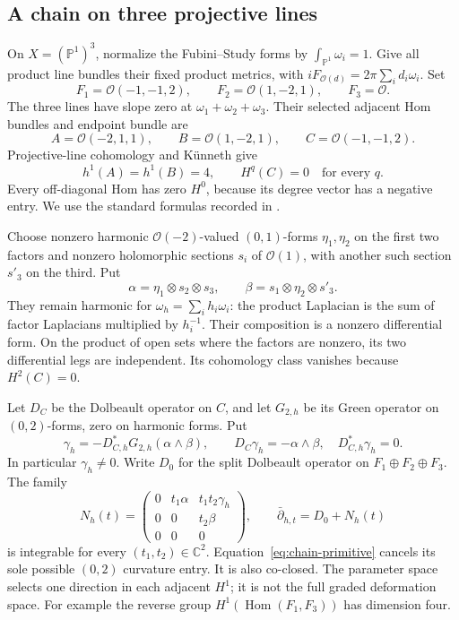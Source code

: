 \documentclass[11pt]{amsart}
\theoremstyle{definition}
\theoremstyle{remark}
\newcommand{\CC}{\mathbb C}
\newcommand{\PP}{\mathbb P}
\newcommand{\cO}{\mathcal O}
\newcommand{\Hom}{\operatorname{Hom}}
\begin{document}


\subsection{A chain on three projective lines}
On $X=(\PP^1)^3$, normalize the Fubini--Study forms by
$\int_{\PP^1}\omega_i=1$. Give all product line bundles their fixed
product metrics, with $iF_{\cO(d)}=2\pi\sum_i d_i\omega_i$. Set
\[
 F_1=\cO(-1,-1,2),\qquad F_2=\cO(1,-2,1),\qquad F_3=\cO.
\]
The three lines have slope zero at $\omega_1+\omega_2+\omega_3$.
Their selected adjacent Hom bundles and endpoint bundle are
\[
 A=\cO(-2,1,1),\qquad B=\cO(1,-2,1),\qquad C=\cO(-1,-1,2).
\]
Projective-line cohomology and K\"unneth give
\[
 h^1(A)=h^1(B)=4,\qquad H^q(C)=0\quad\text{for every }q.
\]
Every off-diagonal Hom has zero $H^0$, because its degree vector has a
negative entry. We use the standard formulas recorded in
\cite[Tags~01XT and 0BED]{stacks}.

Choose nonzero harmonic $\cO(-2)$-valued $(0,1)$-forms $\eta_1,\eta_2$
on the first two factors and nonzero holomorphic sections $s_i$ of
$\cO(1)$, with another such section $s'_3$ on the third. Put
\[
 \alpha=\eta_1\otimes s_2\otimes s_3,\qquad
 \beta=s_1\otimes\eta_2\otimes s'_3.
\]
They remain harmonic for $\omega_h=\sum_i h_i\omega_i$: the product
Laplacian is the sum of factor Laplacians multiplied by $h_i^{-1}$.
Their composition is a nonzero differential form. On the product of open
sets where the factors are nonzero, its two differential legs are independent.
Its cohomology class vanishes because $H^2(C)=0$.

Let $D_C$ be the Dolbeault operator on $C$, and let $G_{2,h}$ be
its Green operator on $(0,2)$-forms, zero on harmonic forms. Put
\begin{equation}\label{eq:chain-primitive}
 \gamma_h=-D_{C,h}^*G_{2,h}(\alpha\wedge\beta),\qquad
 D_C\gamma_h=-\alpha\wedge\beta,\quad D_{C,h}^*\gamma_h=0.
\end{equation}
In particular $\gamma_h\ne0$. Write $D_0$ for the split Dolbeault
operator on $F_1\oplus F_2\oplus F_3$. The family
\begin{equation}\label{eq:chain-matrix}
 N_h(t)=\begin{pmatrix}
 0&t_1\alpha&t_1t_2\gamma_h\\
 0&0&t_2\beta\\0&0&0
 \end{pmatrix},\qquad \bar\partial_{h,t}=D_0+N_h(t)
\end{equation}
is integrable for every $(t_1,t_2)\in\CC^2$. Equation~\eqref{eq:chain-primitive}
cancels its sole possible $(0,2)$ curvature entry. It is also co-closed.
The parameter space selects one direction in each adjacent $H^1$; it is
not the full graded deformation space. For example the reverse group
$H^1(\Hom(F_1,F_3))$ has dimension four.
\end{document}

